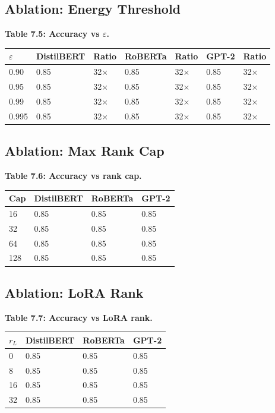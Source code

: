\subsection{Ablation: Energy Threshold}

\textbf{Table 7.5: Accuracy vs $\varepsilon$.}

\begin{table}[H]
\centering
\small
\begin{tabular}{lllllll}
\toprule
\textbf{$\varepsilon$} & \textbf{DistilBERT} & \textbf{Ratio} & \textbf{RoBERTa} & \textbf{Ratio} & \textbf{GPT-2} & \textbf{Ratio} \\
\midrule
0.90 & 0.85 & 32$\times$ & 0.85 & 32$\times$ & 0.85 & 32$\times$ \\
0.95 & 0.85 & 32$\times$ & 0.85 & 32$\times$ & 0.85 & 32$\times$ \\
0.99 & 0.85 & 32$\times$ & 0.85 & 32$\times$ & 0.85 & 32$\times$ \\
0.995 & 0.85 & 32$\times$ & 0.85 & 32$\times$ & 0.85 & 32$\times$ \\
\bottomrule
\end{tabular}
\end{table}

\subsection{Ablation: Max Rank Cap}

\textbf{Table 7.6: Accuracy vs rank cap.}

\begin{table}[H]
\centering
\small
\begin{tabular}{llll}
\toprule
\textbf{Cap} & \textbf{DistilBERT} & \textbf{RoBERTa} & \textbf{GPT-2} \\
\midrule
16 & 0.85 & 0.85 & 0.85 \\
32 & 0.85 & 0.85 & 0.85 \\
64 & 0.85 & 0.85 & 0.85 \\
128 & 0.85 & 0.85 & 0.85 \\
\bottomrule
\end{tabular}
\end{table}

\subsection{Ablation: LoRA Rank}

\textbf{Table 7.7: Accuracy vs LoRA rank.}

\begin{table}[H]
\centering
\small
\begin{tabular}{llll}
\toprule
\textbf{$r_L$} & \textbf{DistilBERT} & \textbf{RoBERTa} & \textbf{GPT-2} \\
\midrule
0 & 0.85 & 0.85 & 0.85 \\
8 & 0.85 & 0.85 & 0.85 \\
16 & 0.85 & 0.85 & 0.85 \\
32 & 0.85 & 0.85 & 0.85 \\
\bottomrule
\end{tabular}
\end{table}

